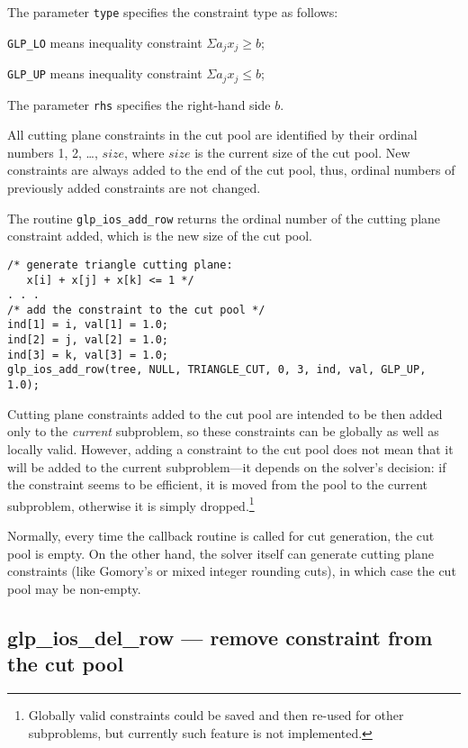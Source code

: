 The parameter \verb|type| specifies the constraint type as follows:

\verb|GLP_LO| means inequality constraint $\Sigma a_jx_j\geq b$;

\verb|GLP_UP| means inequality constraint $\Sigma a_jx_j\leq b$;

\newpage

The parameter \verb|rhs| specifies the right-hand side $b$.

All cutting plane constraints in the cut pool are identified by their
ordinal numbers 1, 2, \dots, $size$, where $size$ is the current size
of the cut pool. New constraints are always added to the end of the cut
pool, thus, ordinal numbers of previously added constraints are not
changed.

\returns

The routine \verb|glp_ios_add_row| returns the ordinal number of the
cutting plane constraint added, which is the new size of the cut pool.


\begin{verbatim}
/* generate triangle cutting plane:
   x[i] + x[j] + x[k] <= 1 */
. . .
/* add the constraint to the cut pool */
ind[1] = i, val[1] = 1.0;
ind[2] = j, val[2] = 1.0;
ind[3] = k, val[3] = 1.0;
glp_ios_add_row(tree, NULL, TRIANGLE_CUT, 0, 3, ind, val, GLP_UP, 1.0);
\end{verbatim}


Cutting plane constraints added to the cut pool are intended to be then
added only to the {\it current} subproblem, so these constraints can be
globally as well as locally valid. However, adding a constraint to the
cut pool does not mean that it will be added to the current
subproblem---it depends on the solver's decision: if the constraint
seems to be efficient, it is moved from the pool to the current
subproblem, otherwise it is simply dropped.\footnote{Globally valid
constraints could be saved and then re-used for other subproblems, but
currently such feature is not implemented.}

Normally, every time the callback routine is called for cut generation,
the cut pool is empty. On the other hand, the solver itself can
generate cutting plane constraints (like Gomory's or mixed integer
rounding cuts), in which case the cut pool may be non-empty.

\subsection{glp\_ios\_del\_row --- remove constraint from the cut pool}

